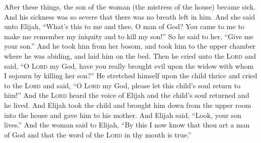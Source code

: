 \begin{inparaenum}
     After these things, the son of the woman (the mistress of the house) became sick. And his sickness was so severe that there was no breath left in him.%
     And she said unto Elijah, ``What's this to me and thee, O man of God? You came to me to make me remember my iniquity and to kill my son!''%
     So he said to her, ``Give me your son.'' And he took him from her bosom, and took him to the upper chamber where he was abiding, and laid him on the bed.%
     Then he cried unto the \textsc{Lord} and said, ``O \textsc{Lord} my God, have you really brought evil upon the widow with whom I sojourn by killing her son?''%
     He stretched himself upon the child thrice and cried to the \textsc{Lord} and said, ``O \textsc{Lord} my God, please let this child's soul return to him!''%
     And the \textsc{Lord} heard the voice of Elijah and the child's soul returned and he lived.%
     And Elijah took the child and brought him down from the upper room into the house and gave him to his mother. And Elijah said, ``Look, your son lives.''%
     And the woman said to Elijah, ``By this I now know that thou art a man of God and that the word of the \textsc{Lord} in thy mouth is true.''%
\end{inparaenum}
